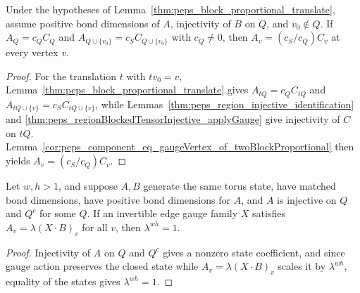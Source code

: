 \begin{lemma}%
    \label{thm:peps_translated_scalar_comparison}
    \leanok
    Under the hypotheses of Lemma~\ref{thm:peps_block_proportional_translate},
    assume positive bond dimensions of $A$, injectivity of $B$ on $Q$, and
    $v_0\notin Q$. If $A_Q=c_Q C_Q$ and
    $A_{Q\cup\{v_0\}}=c_S C_{Q\cup\{v_0\}}$ with $c_Q\ne0$, then
    $A_v=(c_S/c_Q)C_v$ at every vertex $v$.
\end{lemma}
\begin{proof}\leanok
    For the translation $t$ with $tv_0=v$,
    Lemma~\ref{thm:peps_block_proportional_translate} gives
    $A_{tQ}=c_Q C_{tQ}$ and $A_{tQ\cup\{v\}}=c_S C_{tQ\cup\{v\}}$, while
    Lemmas~\ref{thm:peps_region_injective_identification} and
    \ref{thm:peps_regionBlockedTensorInjective_applyGauge} give injectivity of
    $C$ on $tQ$. Lemma~\ref{cor:peps_component_eq_gaugeVertex_of_twoBlockProportional}
    then yields $A_v=(c_S/c_Q)C_v$.
\end{proof}

\begin{lemma}%
    \label{thm:peps_common_scalar_volume}
    \leanok
    Let $w,h>1$, and suppose $A,B$ generate the same torus state, have matched
    bond dimensions, have positive bond dimensions for $A$, and $A$ is
    injective on $Q$ and $Q^c$ for some $Q$. If an invertible edge gauge family
    $X$ satisfies $A_v=\lambda(X\cdot B)_v$ for all $v$, then $\lambda^{wh}=1$.
\end{lemma}
\begin{proof}\leanok
    Injectivity of $A$ on $Q$ and $Q^c$ gives a nonzero state coefficient, and
    since gauge action preserves the closed state while $A_v=\lambda(X\cdot B)_v$
    scales it by $\lambda^{wh}$, equality of the states gives $\lambda^{wh}=1$.
\end{proof}

